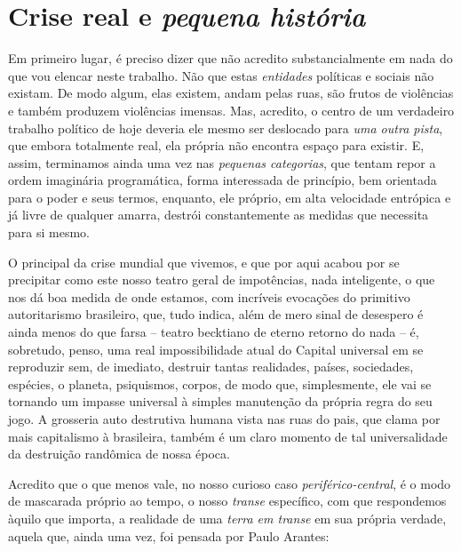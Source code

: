 
\chapter{Crise real e \emph{pequena
história}}\label{crise-real-e-pequena-histuxf3ria}

Em primeiro lugar, é preciso dizer que não acredito substancialmente em
nada do que vou elencar neste trabalho. Não que estas \emph{entidades}
políticas e sociais não existam. De modo algum, elas existem, andam
pelas ruas, são frutos de violências e também produzem violências
imensas. Mas, acredito, o centro de um verdadeiro trabalho político de
hoje deveria ele mesmo ser deslocado para \emph{uma outra pista}, que
embora totalmente real, ela própria não encontra espaço para existir. E,
assim, terminamos ainda uma vez nas \emph{pequenas categorias}, que
tentam repor a ordem imaginária programática, forma interessada de
princípio, bem orientada para o poder e seus termos, enquanto, ele
próprio, em alta velocidade entrópica e já livre de qualquer amarra,
destrói constantemente as medidas que necessita para si mesmo.

O principal da crise mundial que vivemos, e que por aqui acabou por se
precipitar como este nosso teatro geral de impotências, nada
inteligente, o que nos dá boa medida de onde estamos, com incríveis
evocações do primitivo autoritarismo brasileiro, que, tudo indica, além
de mero sinal de desespero é ainda menos do que farsa -- teatro
becktiano de eterno retorno do nada -- é, sobretudo, penso, uma real
impossibilidade atual do Capital universal em se reproduzir sem, de
imediato, destruir tantas realidades, países, sociedades, espécies, o
planeta, psiquismos, corpos, de modo que, simplesmente, ele vai se
tornando um impasse universal à simples manutenção da própria regra do
seu jogo. A grosseria auto destrutiva humana vista nas ruas do pais, que
clama por mais capitalismo à brasileira, também é um claro momento de
tal universalidade da destruição randômica de nossa época.

Acredito que o que menos vale, no nosso curioso caso
\emph{periférico-central}, é o modo de mascarada próprio ao tempo, o
nosso \emph{transe} específico, com que respondemos àquilo que importa,
a realidade de uma \emph{terra em transe} em sua própria verdade, aquela
que, ainda uma vez, foi pensada por Paulo Arantes:

